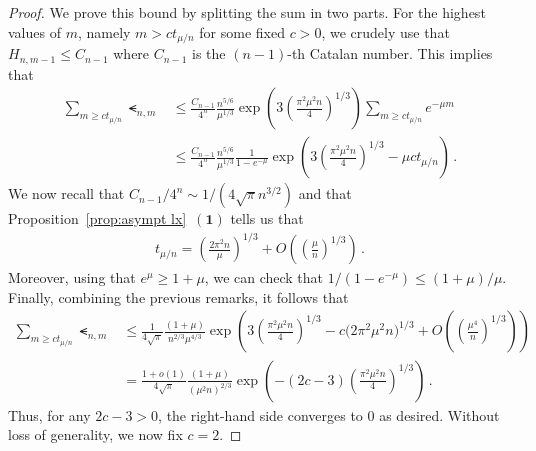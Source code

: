 \documentclass{article}
\newcommand{\1}{\mathbbm{1}}								%
\theoremstyle{definition}
\numberwithin{equation}{section}
\newcommand{\numitem}[1]{$\mathbf{(#1)}$}
\begin{document}
\begin{proof}
    We prove this bound by splitting the sum in two parts.
    For the highest values of $m$, namely $m>ct_{\mu/n}$ for some fixed $c>0$, we crudely use that $H_{n,m-1}\leq C_{n-1}$ where $C_{n-1}$ is the $(n-1)$-th Catalan number.
    This implies that
    \begin{align*}
        \sum_{m\geq ct_{\mu/n}}\smt_{n,m}&\leq\frac{C_{n-1}}{4^n}\frac{n^{5/6}}{\mu^{1/3}}\exp\left(3\left(\frac{\pi^2\mu^2n}{4}\right)^{1/3}\right)\sum_{m\geq ct_{\mu/n}}e^{-\mu m}\\
        &\leq\frac{C_{n-1}}{4^n}\frac{n^{5/6}}{\mu^{1/3}}\frac{1}{1-e^{-\mu}}\exp\left(3\left(\frac{\pi^2\mu^2n}{4}\right)^{1/3}-\mu ct_{\mu/n}\right)\,.
    \end{align*}
    We now recall that $C_{n-1}/4^n\sim 1/(4\sqrt{\pi}n^{3/2})$ and that Proposition~\ref{prop:asympt lx}~\numitem{1} tells us that
    \begin{align*}
        t_{\mu/n}=\left(\frac{2\pi^2n}{\mu}\right)^{1/3}+O\left(\left(\frac{\mu}{n}\right)^{1/3}\right)\,.
    \end{align*}
    Moreover, using that $e^\mu\geq1+\mu$, we can check that $1/(1-e^{-\mu})\leq(1+\mu)/\mu$.
    Finally, combining the previous remarks, it follows that
    \begin{align*}
        \sum_{m\geq ct_{\mu/n}}\smt_{n,m}&\leq\frac{1}{4\sqrt{\pi}}\frac{(1+\mu)}{n^{2/3}\mu^{4/3}}\exp\left(3\left(\frac{\pi^2\mu^2n}{4}\right)^{1/3}-c\big(2\pi^2\mu^2n\big)^{1/3}+O\left(\left(\frac{\mu^4}{n}\right)^{1/3}\right)\right)\\
        &=\frac{1+o(1)}{4\sqrt{\pi}}\frac{(1+\mu)}{(\mu^2n)^{2/3}}\exp\left(-(2c-3)\left(\frac{\pi^2\mu^2n}{4}\right)^{1/3}\right)\,.
    \end{align*}
    Thus, for any $2c-3>0$, the right-hand side converges to $0$ as desired.
    Without loss of generality, we now fix $c=2$.


\end{proof}
\end{document}
